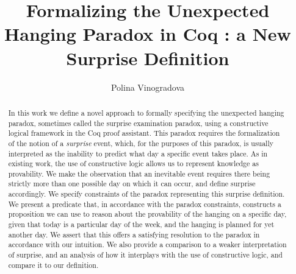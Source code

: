\documentclass[runningheads]{llncs}
\begin{document}
%
\title{Formalizing the Unexpected Hanging Paradox in Coq : a New Surprise Definition} %
%
%
\author{Polina Vinogradova }
%
%
%
\maketitle              %
%
\begin{abstract}

  In this work we define a novel approach to formally specifying the
  unexpected hanging paradox, sometimes called the surprise examination paradox, using a
  constructive logical framework in the
  Coq proof assistant. This paradox requires the formalization of the notion of
  a \emph{surprise} event, which, for the purposes of this paradox, is usually interpreted as
  the inability to predict what day a specific event takes place. As in existing work,
  the use of constructive logic allows us to represent knowledge as provability.
  We make the observation that an inevitable event requires there being strictly
  more than one possible day on which it can occur, and define surprise accordingly. We
  specify constraints of the paradox representing this surprise definition.
  We present a predicate that, in accordance with the paradox constraints, constructs a
  proposition we can use to reason about
  the provability of the hanging on a specific day, given that today is a particular day of the week, and the hanging
  is planned for yet another day.
  We assert that this offers a satisfying resolution to the paradox in accordance with
  our intuition.
  We also provide a comparison to a weaker interpretation of surprise, 
  and an analysis of how it interplays with the use of constructive logic, and
  compare it to our definition.

\end{abstract}
%
\end{document}
